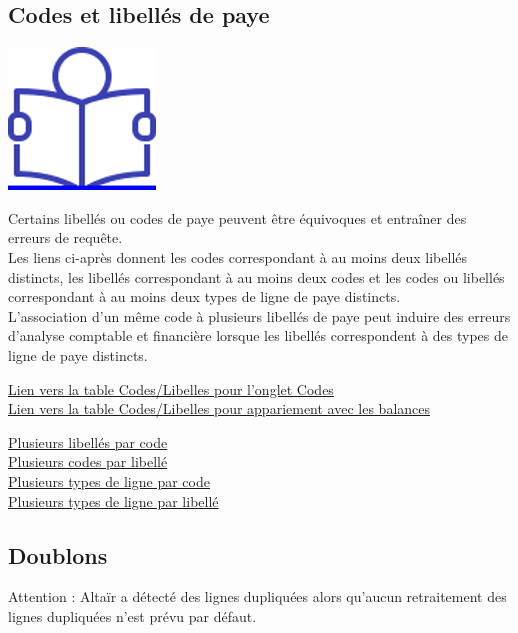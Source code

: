 \hypertarget{codes-et-libelles-de-paye}{%
\subsection{Codes et libellés de paye}\label{codes-et-libelles-de-paye}}

\href{../Docs/Notices/fiche_individualisation.odt}{\includegraphics{icones/Notice.png}}

Certains libellés ou codes de paye peuvent être équivoques et entraîner
des erreurs de requête.\\
Les liens ci-après donnent les codes correspondant à au moins deux
libellés distincts, les libellés correspondant à au moins deux codes et
les codes ou libellés correspondant à au moins deux types de ligne de
paye distincts.\\
L'association d'un même code à plusieurs libellés de paye peut induire
des erreurs d'analyse comptable et financière lorsque les libellés
correspondent à des types de ligne de paye distincts.

\href{../Bases/Fiabilite/code.libelle.short.csv}{Lien vers la table
Codes/Libelles pour l'onglet Codes}\\
\href{../Bases/Fiabilite/code.libelle.csv}{Lien vers la table
Codes/Libelles pour appariement avec les balances}

\href{../Bases/Fiabilite/plusieurs_libelles_par_code.csv}{Plusieurs
libellés par code}\\
\href{../Bases/Fiabilite/plusieurs_codes_par_libelle.csv}{Plusieurs codes
par libellé}\\
\href{../Bases/Fiabilite/plusieurs_types_par_code.csv}{Plusieurs types de
ligne par code}\\
\href{../Bases/Fiabilite/plusieurs_types_par_libelle.csv}{Plusieurs types
de ligne par libellé}

\hypertarget{doublons}{%
\subsection{Doublons}\label{doublons}}

Attention : Altaïr a détecté des lignes dupliquées alors qu'aucun
retraitement des lignes dupliquées n'est prévu par défaut.

